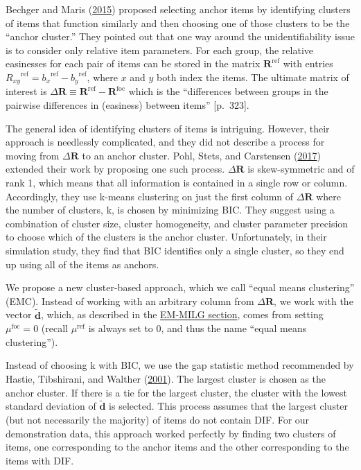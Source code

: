 \documentclass[
  11pt,
]{article}
\begin{document}
Bechger and Maris (\protect\hyperlink{ref-bechger2015statistical}{2015}) proposed selecting anchor items by identifying clusters of items that function similarly and then choosing one of those clusters to be the \enquote{anchor cluster.} They pointed out that one way around the unidentifiability issue is to consider only relative item parameters. For each group, the relative easinesses for each pair of items can be stored in the matrix \(\mathbf{R}^{\text{ref}}\) with entries \({R_{xy}}^{\text{ref}} = {b_x}^{\text{ref}} - {b_y}^{\text{ref}}\), where \(x\) and \(y\) both index the items. The ultimate matrix of interest is \(\Delta \mathbf{R} \equiv \mathbf{R}^{\text{ref}}-\mathbf{R}^{\text{foc}}\) which is the \enquote{differences between groups in the pairwise differences in (easiness) between items} {[}p.~323{]}.

The general idea of identifying clusters of items is intriguing. However, their approach is needlessly complicated, and they did not describe a process for moving from \(\Delta \mathbf{R}\) to an anchor cluster. Pohl, Stets, and Carstensen (\protect\hyperlink{ref-pohl2017cluster}{2017}) extended their work by proposing one such process. \(\Delta \mathbf{R}\) is skew-symmetric and of rank 1, which means that all information is contained in a single row or column. Accordingly, they use k-means clustering on just the first column of \(\Delta \mathbf{R}\) where the number of clusters, k, is chosen by minimizing BIC. They suggest using a combination of cluster size, cluster homogeneity, and cluster parameter precision to choose which of the clusters is the anchor cluster. Unfortunately, in their simulation study, they find that BIC identifies only a single cluster, so they end up using all of the items as anchors.

We propose a new cluster-based approach, which we call \enquote{equal means clustering} (EMC). Instead of working with an arbitrary column from \(\Delta \mathbf{R}\), we work with the vector \(\tilde{\mathbf{d}}\), which, as described in the \protect\hyperlink{emmilg}{EM-MILG section}, comes from setting \(\mu^\text{foc} = 0\) (recall \(\mu^\text{ref}\) is always set to \(0\), and thus the name \enquote{equal means clustering}).

Instead of choosing k with BIC, we use the gap statistic method recommended by Hastie, Tibshirani, and Walther (\protect\hyperlink{ref-hastie2001estimating}{2001}). The largest cluster is chosen as the anchor cluster. If there is a tie for the largest cluster, the cluster with the lowest standard deviation of \(\tilde{\mathbf{d}}\) is selected. This process assumes that the largest cluster (but not necessarily the majority) of items do not contain DIF. For our demonstration data, this approach worked perfectly by finding two clusters of items, one corresponding to the anchor items and the other corresponding to the items with DIF.
\end{document}
